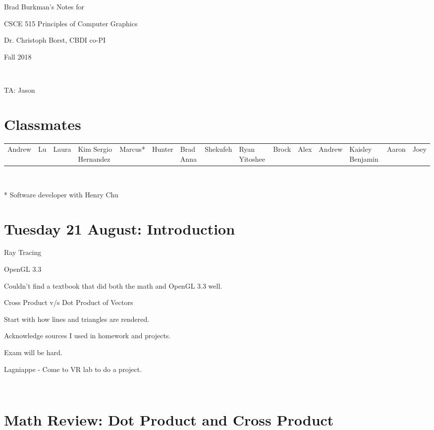 \documentclass[12pt]{article}
\begin{document}
\setlength{\parindent}{0pt}
\begin{spacing}{1.2}

%
%

Brad Burkman's Notes for

\qquad CSCE 515 Principles of Computer Graphics

\qquad Dr. Christoph Borst, CBDI co-PI

\qquad Fall 2018

\

TA:  Jason

\tableofcontents

\section{Classmates}

\begin{tabular}{lllll}
	Andrew & Lu & Laura & Kim \cr
	Sergio Hernandez & Marcus* & Hunter & Brad \cr
	Anna & Shekufeh & Ryan \cr
	Yitoshee & Brock & Alex & Andrew & Kaisley \cr
	Benjamin & Aaron & Joey \cr
\end{tabular}

\

* Software developer with Henry Chu

\section{Tuesday 21 August:  Introduction}

Ray Tracing

OpenGL 3.3

\qquad Couldn't find a textbook that did both the math and OpenGL 3.3 well.  

Cross Product v/s Dot Product of Vectors

Start with how lines and triangles are rendered.  

Acknowledge sources I used in homework and projects.  

Exam will be hard.  

Lagniappe - Come to VR lab to do a project.  

\

\section{Math Review:  Dot Product and Cross Product}


\end{spacing}
\end{document}
